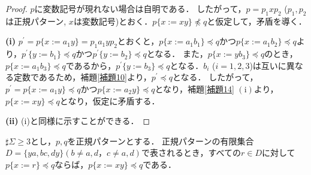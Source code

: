 \begin{proof}
$p$に変数記号が現れない場合は自明である．
したがって，$p=p_{1}xp_{2}$ ($p_{1}, p_{2}$は正規パターン, $x$は変数記号)とおく．$p \{ x := xy \} \not \preceq q$と仮定して，矛盾を導く．

\textbf{(i)} $p^{\prime}=p \{ x:=a_{1}y \} = p_{1}a_{1}yp_{2}$とおくと，$p \{ x:=a_{1}b_{1} \} \preceq q$かつ$p \{ x:=a_{1}b_{2} \} \preceq q$より，$p^{\prime} \{ y:=b_{1} \} \preceq q$かつ$p^{\prime} \{ y:=b_{2} \} \preceq q$となる．
また，$p \{ x:=yb_{3} \} \preceq q$のとき，$p \{ x:=a_{1}b_{3} \} \preceq q$であるから，$p^{\prime} \{ y:=b_{3} \} \preceq q$となる．$b_{i}$ ($i=1,2,3$)は互いに異なる定数であるため，補題\ref{補題10}より，$p^{\prime} \preceq q$となる．
したがって，$p^{\prime}=p \{ x:=a_{1}y \} \preceq q$かつ$p \{ x:= a_{2}y \} \preceq q$となり，補題\ref{補題14} $(\mathrm{i})$より，$p \{ x:=xy \} \preceq q$となり，仮定に矛盾する．

\textbf{(ii)} (i)と同様に示すことができる．
\end{proof}
\begin{lem}\label{追加部分}
$\sharp \Sigma \ge 3$とし，$p, q$を正規パターンとする．
正規パターンの有限集合$D= \{ ya, bc, dy \} (b \not = a,d，c \not = a,d)$で表されるとき，すべての$r \in D$に対して$p \{ x := r \} \preceq q$ならば，$p \{ x := xy \} \preceq q$である．
\end{lem}
